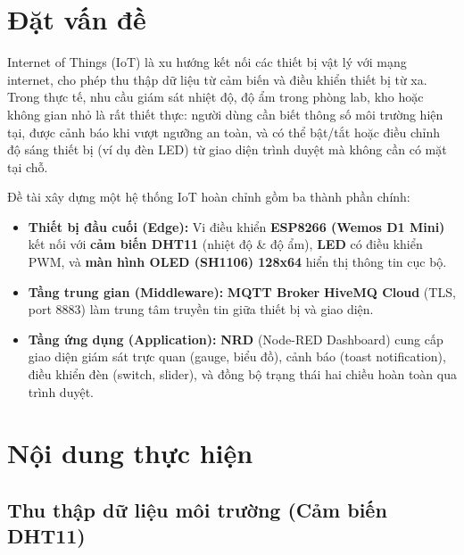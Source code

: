 \documentclass[13pt,a4paper]{article}
\begin{document}
\newpage
\thispagestyle{fancy}
\section{Đặt vấn đề}
\label{sec:datvandde}

Internet of Things (IoT) là xu hướng kết nối các thiết bị vật lý với mạng internet, cho phép thu thập dữ liệu từ cảm biến và điều khiển thiết bị từ xa. Trong thực tế, nhu cầu giám sát nhiệt độ, độ ẩm trong phòng lab, kho hoặc không gian nhỏ là rất thiết thực: người dùng cần biết thông số môi trường hiện tại, được cảnh báo khi vượt ngưỡng an toàn, và có thể bật/tắt hoặc điều chỉnh độ sáng thiết bị (ví dụ đèn LED) từ giao diện trình duyệt mà không cần có mặt tại chỗ.

Đề tài xây dựng một hệ thống IoT hoàn chỉnh gồm ba thành phần chính:

\begin{itemize}
    \item \textbf{Thiết bị đầu cuối (Edge):} Vi điều khiển \textbf{ESP8266 (Wemos D1 Mini)} kết nối với \textbf{cảm biến DHT11} (nhiệt độ \& độ ẩm), \textbf{LED} có điều khiển PWM, và \textbf{màn hình OLED (SH1106) 128x64} hiển thị thông tin cục bộ.
    \item \textbf{Tầng trung gian (Middleware):} \textbf{MQTT Broker} \textbf{HiveMQ Cloud} (TLS, port 8883) làm trung tâm truyền tin giữa thiết bị và giao diện.
    \item \textbf{Tầng ứng dụng (Application):} \textbf{NRD} (Node-RED Dashboard) cung cấp giao diện giám sát trực quan (gauge, biểu đồ), cảnh báo (toast notification), điều khiển đèn (switch, slider), và đồng bộ trạng thái hai chiều hoàn toàn qua trình duyệt.
\end{itemize}

\section{Nội dung thực hiện}
\label{sec:noidung}

\subsection{Thu thập dữ liệu môi trường (Cảm biến DHT11)}
\label{sec:thudulieu}
\end{document}
